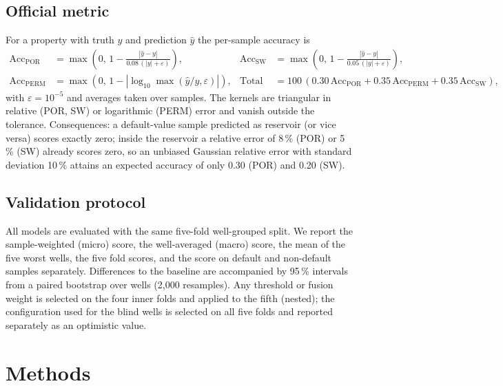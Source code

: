 \documentclass[preprint,12pt]{elsarticle}
\begin{document}
\subsection{Official metric}
\label{sec:metric}

For a property with truth $y$ and prediction $\hat y$ the per-sample accuracy is
\begin{align}
\mathrm{Acc}_{\mathrm{POR}} &= \max\!\left(0,\,1-\frac{|\hat y-y|}{0.08\,(|y|+\varepsilon)}\right), &
\mathrm{Acc}_{\mathrm{SW}} &= \max\!\left(0,\,1-\frac{|\hat y-y|}{0.05\,(|y|+\varepsilon)}\right), \\
\mathrm{Acc}_{\mathrm{PERM}} &= \max\!\left(0,\,1-\left|\log_{10}\max\!\left(\hat y/y,\varepsilon\right)\right|\right), &
\mathrm{Total} &= 100\,(0.30\,\mathrm{Acc}_{\mathrm{POR}}+0.35\,\mathrm{Acc}_{\mathrm{PERM}}+0.35\,\mathrm{Acc}_{\mathrm{SW}}),
\end{align}
with $\varepsilon=10^{-5}$ and averages taken over samples. The kernels are triangular in relative (POR, SW) or logarithmic (PERM) error and vanish outside the tolerance. Consequences: a default-value sample predicted as reservoir (or vice versa) scores exactly zero; inside the reservoir a relative error of 8\,\% (POR) or 5\,\% (SW) already scores zero, so an unbiased Gaussian relative error with standard deviation 10\,\% attains an expected accuracy of only 0.30 (POR) and 0.20 (SW).

\subsection{Validation protocol}
\label{sec:protocol}

All models are evaluated with the same five-fold well-grouped split. We report the sample-weighted (micro) score, the well-averaged (macro) score, the mean of the five worst wells, the five fold scores, and the score on default and non-default samples separately. Differences to the baseline are accompanied by 95\,\% intervals from a paired bootstrap over wells (2,000 resamples). Any threshold or fusion weight is selected on the four inner folds and applied to the fifth (nested); the configuration used for the blind wells is selected on all five folds and reported separately as an optimistic value.

\section{Methods}
\label{sec:methods}
\end{document}
